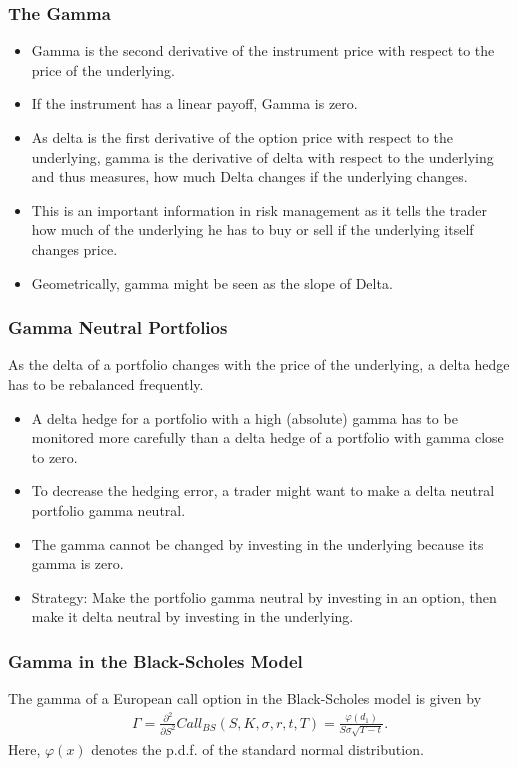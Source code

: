 \begin{frame}[fragile]
\frametitle{The Gamma}
\begin{itemize}
  \item Gamma is the second derivative of the instrument price with respect to
  the price of the underlying.
  \item If the instrument has a linear payoff, Gamma is zero.
  \item As delta is the first derivative of the option price with respect to the
  underlying, gamma is the derivative of delta with respect to the underlying
  and thus measures, how much Delta changes if the underlying changes.
  \item This is an important information in risk management as it tells the
  trader how much of the underlying he has to buy or sell if the underlying
  itself changes price.
  \item Geometrically, gamma might be seen as the slope of Delta.
\end{itemize}
\end{frame}

\begin{frame}[fragile]
\frametitle{Gamma Neutral Portfolios}
As the delta of a portfolio changes with the price of the underlying, a delta
hedge has to be rebalanced frequently. 
\begin{itemize}
  \item A delta hedge for a portfolio with a high (absolute) gamma has to be
  monitored more carefully than a delta hedge of a portfolio with gamma close to
  zero.
  \item To decrease the hedging error, a trader might want to make a delta
  neutral portfolio gamma neutral.
  \item The gamma cannot be changed by investing in the underlying because its
  gamma is zero.
  \item Strategy: Make the portfolio gamma neutral by investing in an option,
  then make it delta neutral by investing in the underlying.
\end{itemize}
\end{frame}


\begin{frame}[fragile]
\frametitle{Gamma in the Black-Scholes Model}
The gamma of a European call option in the Black-Scholes model is given by
\begin{align*}
  \Gamma = \frac{\partial^2}{\partial S^2}Call_{BS}(S,K,\sigma,r,t,T) =
  \frac{\varphi(d_1)}{S\sigma \sqrt{T-t}}.
\end{align*}
Here, $\varphi(x)$ denotes the p.d.f. of the standard normal distribution.
\end{frame}

